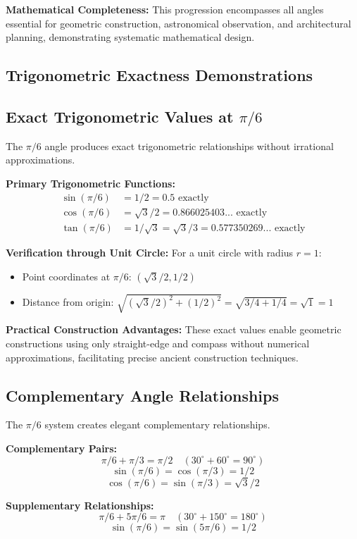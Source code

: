 \documentclass[11pt]{article}
\begin{document}
\textbf{Mathematical Completeness:} This progression encompasses all angles essential for geometric construction, astronomical observation, and architectural planning, demonstrating systematic mathematical design.

\subsection{Trigonometric Exactness Demonstrations}

\subsection{Exact Trigonometric Values at \texorpdfstring{$\pi/6$}{pi/6}}
The $\pi/6$ angle produces exact trigonometric relationships without irrational approximations.

\textbf{Primary Trigonometric Functions:}
\begin{align*}
\sin(\pi/6) &= 1/2 = 0.5 \text{ exactly} \\
\cos(\pi/6) &= \sqrt{3}/2 = 0.866025403... \text{ exactly} \\
\tan(\pi/6) &= 1/\sqrt{3} = \sqrt{3}/3 = 0.577350269... \text{ exactly}
\end{align*}

\textbf{Verification through Unit Circle:}
For a unit circle with radius $r = 1$:
\begin{itemize}
    \item Point coordinates at $\pi/6$: $(\sqrt{3}/2, 1/2)$
    \item Distance from origin: $\sqrt{(\sqrt{3}/2)^2 + (1/2)^2} = \sqrt{3/4 + 1/4} = \sqrt{1} = 1$ 
\end{itemize}

\textbf{Practical Construction Advantages:} These exact values enable geometric constructions using only straight-edge and compass without numerical approximations, facilitating precise ancient construction techniques.

\subsection{Complementary Angle Relationships}
The $\pi/6$ system creates elegant complementary relationships.

\textbf{Complementary Pairs:}
\[ \pi/6 + \pi/3 = \pi/2 \quad (30^\circ + 60^\circ = 90^\circ) \]
\[ \sin(\pi/6) = \cos(\pi/3) = 1/2 \]
\[ \cos(\pi/6) = \sin(\pi/3) = \sqrt{3}/2 \]

\textbf{Supplementary Relationships:}
\[ \pi/6 + 5\pi/6 = \pi \quad (30^\circ + 150^\circ = 180^\circ) \]
\[ \sin(\pi/6) = \sin(5\pi/6) = 1/2 \]
\end{document}
